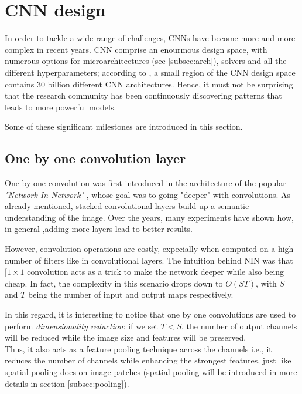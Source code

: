 \section{CNN design}
In order to tackle a wide range of challenges, CNNs have become more and more complex in recent years. CNN comprise an enourmous design space, with numerous options for microarchitectures (see \ref{subsec:arch}), solvers and all the different hyperparameters; according to \parencite{cnn-design}, a small region of the CNN design space contains 30 billion different CNN architectures. Hence, it must not be surprising that the research community has been continuously discovering patterns that leads to more powerful models. 

Some of these significant milestones are introduced in this section. 

\subsection{One by one convolution layer}
\label{subsec:onebyone}
One by one convolution was first introduced in the architecture of the popular \emph{"Network-In-Network"} \parencite{NIN}, whose goal was to going "deeper" with convolutions. As already mentioned, stacked convolutional layers build up a semantic understanding of the image. Over the years, many experiments have shown how, in general ,adding more layers lead to better results.

However, convolution operations are costly, expecially when computed on a high number of filters like in convolutional layers. The intuition behind NIN was that $[1 \times 1$ convolution acts as a trick to make the network deeper while also being cheap. In fact, 
the complexity in this scenario drops down to $O(ST)$, with $S$ and $T$ being the number of input and output maps respectively. 
\newline

In this regard, it is interesting to notice that one by one convolutions are used to perform \emph{dimensionality reduction}: if we set $T < S$, the number of output channels will be reduced while the image size and features will be preserved. 
\\
Thus, it also acts as a feature pooling technique across the channels i.e., it reduces the number of channels while enhancing the strongest features, just like spatial pooling does on image patches (spatial pooling will be introduced in more details in section \ref{subsec:pooling}).
\newline 


